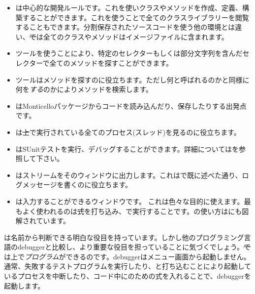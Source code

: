 \documentclass[a4paper,10pt,twoside]{book}
\begin{document}
\begin{itemize}
	\item{}は中心的な開発ルールです。これを使いクラスやメソッドを作成、定義、構築することができます。これを使うことで全てのクラスライブラリーを閲覧することもできます。分割保存されたソースコードを使う他の環境とは違い、\st では全てのクラスやメソッドはイメージファイルに含まれます。

	\item{}ツールを使うことにより、特定のセレクターもしくは部分文字列を含んだセレクターで全てのメソッドを探すことができます。
	
	\item{}ツールはメソッドを探すのに役立ちます。ただし何と呼ばれるのかと同様に何を\emph{する}のかによりメソッドを検索します。
	
	\item{}はMonticelloパッケージからコードを読み込んだり、保存したりする出発点です。
	
	\item{}は\st 上で実行されている全てのプロセス(スレッド)を見るのに役立ちます。
	
	\item{}はSUnitテストを実行、デバッグすることができます。詳細についてはを参照して下さい。
	
	\item{}はストリームをそのウィンドウに出力します。これはで既に述べた通り、ログメッセージを書くのに役立ちます。
	
	\item{}は入力することができるウィンドウです。 これは色々な目的に使えます。最もよく使われるのは\st 式を打ち込み、で実行することです。の使い方はにも図解されています。
\end{itemize}

は名前から判断できる明白な役目を持っています。しかし他のプログラミング言語のdebuggerと比較し、より重要な役目を担っていることに気づくでしょう。\st では上で\emph{プログラム}ができるのです。debuggerはメニュー画面から起動しません。通常、失敗するテストプログラムを実行したり、と打ち込むことにより起動しているプロセスを中断したり、コード中にのための式を入れることで、debuggerを起動します。
\end{document}
